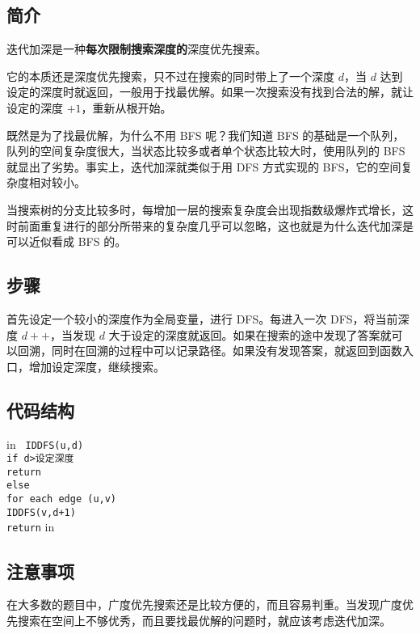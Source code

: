 
\subsection{简介}

迭代加深是一种\textbf{每次限制搜索深度的}深度优先搜索。

它的本质还是深度优先搜索，只不过在搜索的同时带上了一个深度 $d$，当 $d$ 达到设定的深度时就返回，一般用于找最优解。如果一次搜索没有找到合法的解，就让设定的深度 $+1$，重新从根开始。

既然是为了找最优解，为什么不用 BFS 呢？我们知道 BFS 的基础是一个队列，队列的空间复杂度很大，当状态比较多或者单个状态比较大时，使用队列的 BFS 就显出了劣势。事实上，迭代加深就类似于用 DFS 方式实现的 BFS，它的空间复杂度相对较小。

当搜索树的分支比较多时，每增加一层的搜索复杂度会出现指数级爆炸式增长，这时前面重复进行的部分所带来的复杂度几乎可以忽略，这也就是为什么迭代加深是可以近似看成 BFS 的。

\subsection{步骤}

首先设定一个较小的深度作为全局变量，进行 DFS。每进入一次 DFS，将当前深度 $d++$，当发现 $d$ 大于设定的深度就返回。如果在搜索的途中发现了答案就可以回溯，同时在回溯的过程中可以记录路径。如果没有发现答案，就返回到函数入口，增加设定深度，继续搜索。

\subsection{代码结构}

 in
\texttt{
IDDFS(u,d)\\    if d>设定深度\\        return\\    else\\        for each edge (u,v)\\            IDDFS(v,d+1)\\	return}
 in

\subsection{注意事项}

在大多数的题目中，广度优先搜索还是比较方便的，而且容易判重。当发现广度优先搜索在空间上不够优秀，而且要找最优解的问题时，就应该考虑迭代加深。
